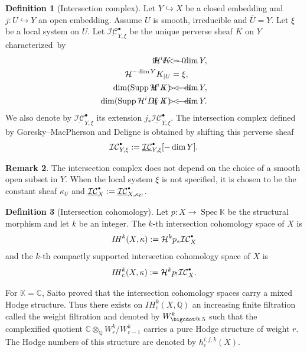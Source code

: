 \documentclass[JEP,XML,SOM,NoEqCountersInSection,Unicode,published]{cedram}
\makeatletter
\newcommand{\sbullet}{{\scriptscriptstyle\bullet}}
\newcommand{\csbullet}{{\raisebox{1pt}{$\sbullet$}}}
\newcommand{\rc}{\mathrm{c}}
\newcommand*\bigcdot{\mathpalette\bigcdot@{.5}}
\newcommand*\bigcdot@[2]{\mathbin{\vcenter{\hbox{\scalebox{#2}{$\m@th#1\bullet$}}}}}
\theoremstyle{definition}
\newtheorem{definition}{Definition}[section]
\newtheorem{remark}[definition]{Remark}
\theoremstyle{plain}
\DeclareMathOperator{\Spec}{Spec}
\DeclareMathOperator{\supp}{Supp}
\newcommand\KK{\mathbb K }
\newcommand{\C}{\mathbb{C}}
\newcommand{\IH}{\mathit{IH}}
\newcommand{\hi}{\mathcal H ^i}
\newcommand{\uic}[1]{\underline{\mathcal{I C}}_{#1}^{\csbullet}}
\newcommand{\ic}[1]{\mathcal{I C}_{#1}^{\csbullet}}
\makeatother
\begin{document}
\begin{definition}[Intersection complex]\label{def_intersection_complex}
Let $Y\hookrightarrow X$ be a closed embedding and $j:U\hookrightarrow Y$ an open embedding. Assume $U$ is smooth, irreducible and $\overline U = Y$. Let $\xi$ be a local system on $U$. Let $\underline{\mathcal{I C}}_{Y,\xi}^\bullet$ be the unique perverse sheaf $K$ on $Y$ characterized~by
\begin{align*}
\hi K &= 0 &&\hspace*{-2cm}\text{if \ } i < -\dim Y,\\
\mathcal{H}^{-\dim Y} K_{| U}&=\xi,\\
\dim(\supp \hi K) &< -i &&\hspace*{-2cm}\text{if \ } i > -\dim Y, \\
\dim(\supp \hi D_Y K) &< -i &&\hspace*{-2cm}\text{if \ } i > -\dim Y.
\end{align*}
We also denote by $\underline{\mathcal{I C}}_{Y,\xi}^\bullet$ its extension $j_*\underline{\mathcal{I C}}_{Y,\xi}^\bullet$. The intersection complex defined by Goresky--MacPherson \cite{Goresky_MacPherson} and Deligne is obtained by shifting this perverse sheaf
\[
\ic{Y,\xi}:=\uic{Y,\xi}[-\dim Y].
\]
\end{definition}

\begin{remark}
The intersection complex does not depend on the choice of a smooth open subset in $Y$. When the local system $\xi$ is not specified, it is chosen to be the constant sheaf $\kappa_U$ and $\uic X := \uic {X,\kappa_U}$.
\end{remark}

\begin{definition}[Intersection cohomology]
Let $p:X\to \Spec \KK$ be the structural morphism and let $k$ be an integer. The $k$-th intersection cohomology space of $X$ is
\[
\IH^k(X,\kappa) := \mathcal{H}^k p_* \ic X
\]
and the $k$-th compactly supported intersection cohomology space of $X$ is
\[
\IH^k_\rc (X,\kappa) := \mathcal{H}^k p_! \ic X.
\]

\end{definition}

For $\KK=\C$, Saito \cite{Saito1986} proved that the intersection cohomology spaces carry a mixed Hodge structure. Thus there exists on $\IH_{\rc}^k(X,\mathbb{Q})$ an increasing finite filtration called the weight filtration and denoted by $W^k_{\bigcdot}$ such that the complexified quotient $\mathbb{C}\otimes_{\mathbb{Q}}W^k_{r}/ W^k_{r-1}$ carries a pure Hodge structure of weight $r$. The Hodge numbers of this structure are denoted by $h_\rc ^{i,j,k}(X)$.
\end{document}
